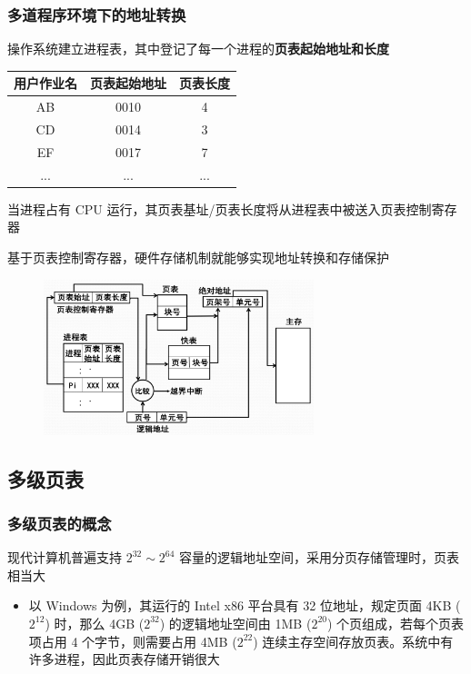 \documentclass[cs4size,a4paper,10pt]{ctexart}
\begin{document}
		\subsubsection{多道程序环境下的地址转换}
		操作系统建立进程表，其中登记了每一个进程的\textbf{页表起始地址和长度}
		\begin{table}[H]
			\centering
			\begin{tabular}{|c|c|c|}
			\hline
			用户作业名 & 页表起始地址 & 页表长度 \\ \hline
			AB    & 0010   & 4    \\ \hline
			CD    & 0014   & 3    \\ \hline
			EF    & 0017   & 7    \\ \hline
			...   & ...    & ...  \\ \hline
			\end{tabular}
		\end{table}

		当进程占有 CPU 运行，其页表基址/页表长度将从进程表中被送入页表控制寄存器

		基于页表控制寄存器，硬件存储机制就能够实现地址转换和存储保护

		\begin{figure}[H]
			\centering
			\includegraphics[width=0.7\textwidth]{img/3.3.2.3}
		\end{figure}

		\subsection{多级页表}
		\subsubsection{多级页表的概念}
		现代计算机普遍支持 $2^{32}\sim 2^{64}$ 容量的逻辑地址空间，采用分页存储管理时，页表相当大
		\begin{itemize}
			\item 以 Windows 为例，其运行的 Intel x86 平台具有 32 位地址，规定页面 4KB ($2^{12}$) 时，那么 4GB ($2^{32}$) 的逻辑地址空间由 1MB ($2^{20}$) 个页组成，若每个页表项占用 4 个字节，则需要占用 4MB ($2^{22}$) 连续主存空间存放页表。系统中有许多进程，因此页表存储开销很大
		\end{itemize}
\end{document}
